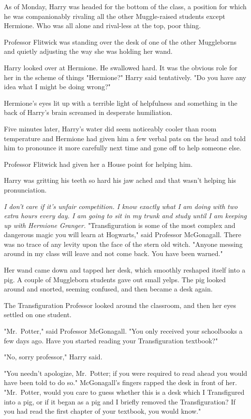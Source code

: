 As of Monday, Harry was headed for the bottom of the class, a position for
which he was companionably rivaling all the other Muggle-raised students
except Hermione. Who was all alone and rival-less at the top, poor thing.

Professor Flitwick was standing over the desk of one of the other Muggleborns
and quietly adjusting the way she was holding her wand.

Harry looked over at Hermione. He swallowed hard. It was the obvious role for
her in the scheme of things{\el} "Hermione?" Harry said tentatively. "Do you
have any idea what I might be doing wrong?"

Hermione's eyes lit up with a terrible light of helpfulness and something in
the back of Harry's brain screamed in desperate humiliation.

Five minutes later, Harry's water did seem noticeably cooler than room
temperature and Hermione had given him a few verbal pats on the head and told
him to pronounce it more carefully next time and gone off to help someone else.

Professor Flitwick had given her a House point for helping him.

Harry was gritting his teeth so hard his jaw ached and that wasn't helping his
pronunciation.

\emph{I don't care if it's unfair competition. I know exactly what I am doing
with two extra hours every day. I am going to sit in my trunk and study until I
am keeping up with Hermione Granger.}
\sbreak
"Transfiguration is some of the most complex and dangerous magic you will learn
at Hogwarts," said Professor McGonagall. There was no trace of any levity upon
the face of the stern old witch. "Anyone messing around in my class will leave
and not come back. You have been warned."

Her wand came down and tapped her desk, which smoothly reshaped itself into a
pig. A couple of Muggleborn students gave out small yelps. The pig looked
around and snorted, seeming confused, and then became a desk again.

The Transfiguration Professor looked around the classroom, and then her eyes
settled on one student.

"Mr.~Potter," said Professor McGonagall. "You only received your schoolbooks a
few days ago. Have you started reading your Transfiguration textbook?"

"No, sorry professor," Harry said.

"You needn't apologize, Mr.~Potter; if you were required to read ahead you
would have been told to do so." McGonagall's fingers rapped the desk in front
of her. "Mr.~Potter, would you care to guess whether this is a desk which I
Transfigured into a pig, or if it began as a pig and I briefly removed the
Transfiguration? If you had read the first chapter of your textbook, you would
know."

